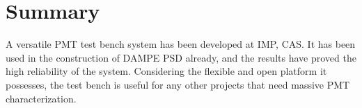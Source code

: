 \documentclass{nst}
\begin{document}
\section{Summary}
\label{sec:summary}
A versatile PMT test bench system has been developed at IMP, CAS.
It has been used in the construction of DAMPE PSD already, and the results have proved the high reliability of the system.
Considering the flexible and open platform it possesses, the test bench is useful for any other projects that need massive PMT characterization. 

\end{document}
